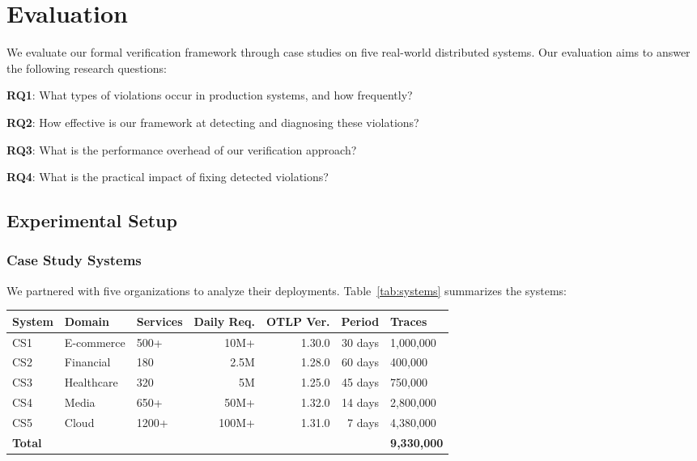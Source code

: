 
\section{Evaluation}
\label{sec:evaluation}

We evaluate our formal verification framework through case studies on five real-world distributed systems. Our evaluation aims to answer the following research questions:

\textbf{RQ1}: What types of \otlp violations occur in production systems, and how frequently?

\textbf{RQ2}: How effective is our framework at detecting and diagnosing these violations?

\textbf{RQ3}: What is the performance overhead of our verification approach?

\textbf{RQ4}: What is the practical impact of fixing detected violations?

\subsection{Experimental Setup}
\label{sec:setup}

\subsubsection{Case Study Systems}

We partnered with five organizations to analyze their \otlp deployments. Table~\ref{tab:systems} summarizes the systems:

\begin{table*}[t]
\caption{Case Study Systems Overview}
\label{tab:systems}
\small
\begin{tabular}{lllrrrl}
\toprule
\textbf{System} & \textbf{Domain} & \textbf{Services} & \textbf{Daily Req.} & \textbf{OTLP Ver.} & \textbf{Period} & \textbf{Traces} \\
\midrule
CS1 & E-commerce & 500+ & 10M+ & 1.30.0 & 30 days & 1,000,000 \\
CS2 & Financial & 180 & 2.5M & 1.28.0 & 60 days & 400,000 \\
CS3 & Healthcare & 320 & 5M & 1.25.0 & 45 days & 750,000 \\
CS4 & Media & 650+ & 50M+ & 1.32.0 & 14 days & 2,800,000 \\
CS5 & Cloud & 1200+ & 100M+ & 1.31.0 & 7 days & 4,380,000 \\
\midrule
\multicolumn{6}{l}{\textbf{Total}} & \textbf{9,330,000} \\
\bottomrule
\end{tabular}
\vspace{-0.1in}
\end{table*}

